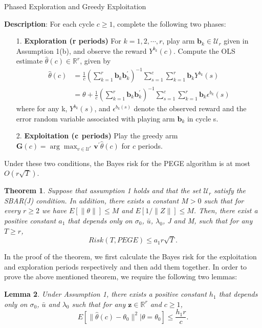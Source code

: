 \documentclass{article}
\newtheorem{theorem}{Theorem}
\newtheorem{lemma}[theorem]{Lemma}
\theoremstyle{plain}
\theoremstyle{definition}
\begin{document}
\begin{algorithm}\label{alg:PEGE}
\caption{Phased Exploration and Greedy Exploitation}
\textbf{Description}: For each cycle $c\geq 1$, complete the following two phases:
\begin{itemize}
\item [1. ] \textbf{Exploration (r periods)} For $k=1,2,\cdots,r$, play arm $\textbf{b}_{k}\in \mathcal{U}_{r}$ given in Assumption 1(b), and observe the reward $Y^{b_{k}}(c)$. Compute the OLS estimate $\hat{\theta}(c)\in \mathbb{R}^{r}$, given by
\begin{align}
\hat{\theta}(c)&=\frac{1}{c}(\sum_{k=1}^{r}\textbf{b}_{k}\textbf{b}_{k}^{'})^{-1}\sum_{s=1}^{c}\sum_{k=1}^{r}\textbf{b}_{k}Y^{b_{k}}(s) \nonumber \\
&=\theta+\frac{1}{c}(\sum_{k=1}^{r}\textbf{b}_{k}\textbf{b}_{k}^{'})^{-1}\sum_{s=1}^{c}\sum_{k=1}^{r}\textbf{b}_{k}\epsilon^{b_{k}}(s) \nonumber 
\end{align}
where for any k, $Y^{b_{k}}(s)$, and $\epsilon^{b_{k}(s)}$ denote the observed reward and the error random variable associated with playing arm $\textbf{b}_{k}$ in cycle s.
\item [2. ] \textbf{Exploitation ($\bold{c}$ periods)} Play the greedy arm $\textbf{G}(c)=\arg \max_{v\in \mathcal{U}^{r}}\textbf{v}^{'}\hat{\theta}(c)$ for $c$ periods.
\end{itemize}
\end{algorithm}


Under these two conditions, the Bayes risk for the PEGE algorithm is at most $O(r\sqrt{T})$.

\begin{theorem}
Suppose that assumption 1 holds and that the set $\mathcal{U}_{r}$ satisfy the SBAR(J) condition. In addition, there exists a constant $M>0$ such that for every $r\geq 2$ we have $E[\|\theta\|]\leq M$ and $E[1/\|Z\|]\leq M$. Then, there exist a positive constant $a_{1}$ that depends only on $\sigma_{0}$, $\bar{u}$, $\lambda_{0}$, J and M, such that for any $T\geq r$,
\begin{equation}
Risk(T,PEGE)\leq a_{1}r\sqrt{T}. \nonumber 
\end{equation}

\end{theorem}

In the proof of the theorem, we first calculate the Bayes risk for the exploitation and exploration periods respectively and then add them together. In order to prove the above mentioned theorem, we require the following two lemmas:
\begin{lemma}
Under Assumption 1, there exists a positive constant $h_{1}$ that depends only on $\sigma_{0}$, $\bar{u}$ and $\lambda_{0}$ such that for any $\textbf{z}\in \mathbb{R}^{r}$ and $c\geq 1$,
\begin{equation}\label{eq:Esquare}
E\left[\|\hat{\theta}(c)-\theta_{0}\|^{2}|\theta=\theta_{0}\right]\leq \frac{h_{1}r}{c}. 
\end{equation} 
\end{lemma}
\end{document}
